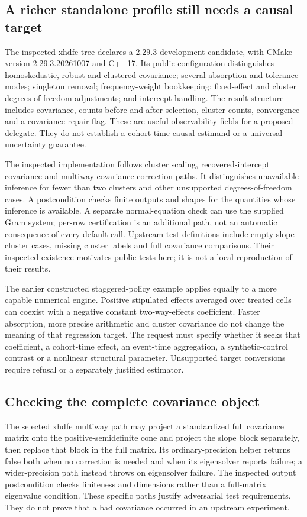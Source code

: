 \subsection{A richer standalone profile still needs a causal target}
The inspected xhdfe tree declares a 2.29.3 development candidate, with CMake
version 2.29.3.20261007 and C++17. Its public configuration distinguishes
homoskedastic, robust and clustered covariance; several absorption and
tolerance modes; singleton removal; frequency-weight bookkeeping;
fixed-effect and cluster degrees-of-freedom adjustments; and intercept
handling. The result structure includes covariance, counts before and after
selection, cluster counts, convergence and a covariance-repair flag. These
are useful observability fields for a proposed delegate. They do not
establish a cohort-time causal estimand or a universal uncertainty guarantee.
\citep{exec25_panelcxx_xhdfe}

The inspected implementation follows cluster scaling, recovered-intercept
covariance and multiway covariance correction paths. It distinguishes
unavailable inference for fewer than two clusters and other unsupported
degrees-of-freedom cases. A postcondition checks finite outputs and shapes
for the quantities whose inference is available. A separate normal-equation
check can use the supplied Gram system; per-row certification is an
additional path, not an automatic consequence of every default call.
Upstream test definitions include empty-slope cluster cases, missing cluster
labels and full covariance comparisons. Their inspected existence motivates
public tests here; it is not a local reproduction of their results.
\citep{exec25_panelcxx_xhdfe}

The earlier constructed staggered-policy example applies equally to a more
capable numerical engine. Positive stipulated effects averaged over treated
cells can coexist with a negative constant two-way-effects coefficient.
Faster absorption, more precise arithmetic and cluster covariance do not
change the meaning of that regression target. The request must specify
whether it seeks that coefficient, a cohort-time effect, an event-time
aggregation, a synthetic-control contrast or a nonlinear structural
parameter. Unsupported target conversions require refusal or a separately
justified estimator.\citep{exec25_paneljava_reference,exec25_panelcxx_reference}

\subsection{Checking the complete covariance object}
The selected xhdfe multiway path may project a standardized full covariance
matrix onto the positive-semidefinite cone and project the slope block
separately, then replace that block in the full matrix. Its ordinary-precision
helper returns false both when no correction is needed and when its
eigensolver reports failure; a wider-precision path instead throws on
eigensolver failure. The inspected output postcondition checks finiteness
and dimensions rather than a full-matrix eigenvalue condition. These
specific paths justify adversarial test requirements. They do not prove
that a bad covariance occurred in an upstream experiment.
\citep{exec25_panelcxx_xhdfe}

